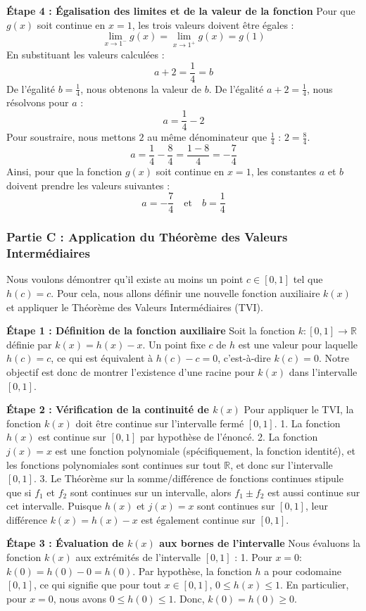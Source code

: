 \documentclass[12pt,a4paper]{report}
\begin{document}
\textbf{Étape 4 : Égalisation des limites et de la valeur de la fonction}
Pour que $g(x)$ soit continue en $x=1$, les trois valeurs doivent être égales :
$$
\lim_{x \to 1^-} g(x) = \lim_{x \to 1^+} g(x) = g(1)
$$
En substituant les valeurs calculées :
$$
a + 2 = \frac{1}{4} = b
$$
De l'égalité $b = \frac{1}{4}$, nous obtenons la valeur de $b$.
De l'égalité $a + 2 = \frac{1}{4}$, nous résolvons pour $a$ :
$$
a = \frac{1}{4} - 2
$$
Pour soustraire, nous mettons $2$ au même dénominateur que $\frac{1}{4}$ : $2 = \frac{8}{4}$.
$$
a = \frac{1}{4} - \frac{8}{4} = \frac{1 - 8}{4} = -\frac{7}{4}
$$
Ainsi, pour que la fonction $g(x)$ soit continue en $x=1$, les constantes $a$ et $b$ doivent prendre les valeurs suivantes :
$$
a = -\frac{7}{4} \quad \text{et} \quad b = \frac{1}{4}
$$

\subsubsection{Partie C : Application du Théorème des Valeurs Intermédiaires}

Nous voulons démontrer qu'il existe au moins un point $c \in [0,1]$ tel que $h(c) = c$.
Pour cela, nous allons définir une nouvelle fonction auxiliaire $k(x)$ et appliquer le Théorème des Valeurs Intermédiaires (TVI).

\textbf{Étape 1 : Définition de la fonction auxiliaire}
Soit la fonction $k: [0,1] \to \mathbb{R}$ définie par $k(x) = h(x) - x$.
Un point fixe $c$ de $h$ est une valeur pour laquelle $h(c) = c$, ce qui est équivalent à $h(c) - c = 0$, c'est-à-dire $k(c) = 0$. Notre objectif est donc de montrer l'existence d'une racine pour $k(x)$ dans l'intervalle $[0,1]$.

\textbf{Étape 2 : Vérification de la continuité de $k(x)$}
Pour appliquer le TVI, la fonction $k(x)$ doit être continue sur l'intervalle fermé $[0,1]$.
1.  La fonction $h(x)$ est continue sur $[0,1]$ par hypothèse de l'énoncé.
2.  La fonction $j(x) = x$ est une fonction polynomiale (spécifiquement, la fonction identité), et les fonctions polynomiales sont continues sur tout $\mathbb{R}$, et donc sur l'intervalle $[0,1]$.
3.  Le Théorème sur la somme/différence de fonctions continues stipule que si $f_1$ et $f_2$ sont continues sur un intervalle, alors $f_1 \pm f_2$ est aussi continue sur cet intervalle.
Puisque $h(x)$ et $j(x)=x$ sont continues sur $[0,1]$, leur différence $k(x) = h(x) - x$ est également continue sur $[0,1]$.

\textbf{Étape 3 : Évaluation de $k(x)$ aux bornes de l'intervalle}
Nous évaluons la fonction $k(x)$ aux extrémités de l'intervalle $[0,1]$ :
1.  Pour $x=0$:
    $k(0) = h(0) - 0 = h(0)$.
    Par hypothèse, la fonction $h$ a pour codomaine $[0,1]$, ce qui signifie que pour tout $x \in [0,1]$, $0 \le h(x) \le 1$.
    En particulier, pour $x=0$, nous avons $0 \le h(0) \le 1$.
    Donc, $k(0) = h(0) \ge 0$.
\end{document}

